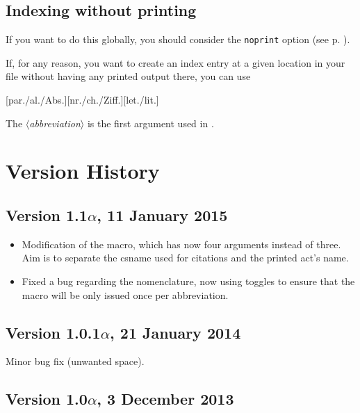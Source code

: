 \documentclass[a4paper]{ltxdockit}[2011/03/25]
\newcommand{\variable}[1]{$\langle$\textsl{#1}$\rangle$}
\begin{document}
\subsection{Indexing without printing}

\label{indexwhithoutprint}

If you want to do this globally, you should consider the \texttt{noprint} option (see p. \pageref{options}).

If, for any reason, you want to create an index entry at a given location in your file without having any printed output there, you can use

\begin{ltxsyntax}
[par./al./Abs.][nr./ch./Ziff.][let./lit.]
\end{ltxsyntax} 

The \variable{abbreviation} is the first argument used in . 


\section{Version History}

\subsection*{Version 1.1$\alpha$, 11 January 2015}

\begin{itemize}
\item Modification of the  macro, which has now four arguments instead of three. Aim is to separate the csname used for citations and the printed act's name.
\item Fixed a bug regarding the nomenclature, now using toggles to ensure that the  macro will be only issued once per abbreviation.
\end{itemize}

\subsection*{Version 1.0.1$\alpha$, 21 January 2014}

Minor bug fix (unwanted space).

\subsection*{Version 1.0$\alpha$, 3 December 2013}
\end{document}
